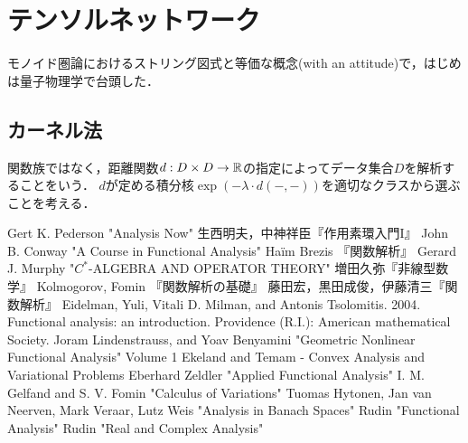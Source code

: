 \documentclass[uplatex,dvipdfmx]{jsreport}
\begin{document}
\section{テンソルネットワーク}

\begin{tcolorbox}[colframe=ForestGreen, colback=ForestGreen!10!white,breakable,colbacktitle=ForestGreen!40!white,coltitle=black,fonttitle=\bfseries\sffamily,
title=]
    モノイド圏論におけるストリング図式と等価な概念(with an attitude)で，はじめは量子物理学で台頭した．
\end{tcolorbox}

\subsection{カーネル法}

\begin{tcolorbox}[colframe=ForestGreen, colback=ForestGreen!10!white,breakable,colbacktitle=ForestGreen!40!white,coltitle=black,fonttitle=\bfseries\sffamily,
title=]
    関数族ではなく，距離関数$d:D\times D\to\mathbb{R}$の指定によってデータ集合$D$を解析することをいう．
    $d$が定める積分核$\exp(-\lambda\cdot d(-,-))$を適切なクラスから選ぶことを考える．
\end{tcolorbox}

\begin{thebibliography}{99}
    Gert K. Pederson "Analysis Now"
    生西明夫，中神祥臣『作用素環入門I』
    John B. Conway "A Course in Functional Analysis"
    Haïm Brezis 『関数解析』
    Gerard J. Murphy "$C^*$-ALGEBRA AND OPERATOR THEORY"
    増田久弥『非線型数学』
    Kolmogorov, Fomin 『関数解析の基礎』
    藤田宏，黒田成俊，伊藤清三『関数解析』
    Eidelman, Yuli, Vitali D. Milman, and Antonis Tsolomitis. 2004. Functional analysis: an introduction. Providence (R.I.): American mathematical Society.
    Joram Lindenstrauss, and Yoav Benyamini "Geometric Nonlinear Functional Analysis" Volume 1
    Ekeland and Temam -  Convex Analysis and Variational Problems
    Eberhard Zeldler "Applied Functional Analysis"
    I. M. Gelfand and S. V. Fomin "Calculus of Variations"
    Tuomas Hytonen, Jan van Neerven, Mark Veraar, Lutz Weis "Analysis in Banach Spaces"
    Rudin "Functional Analysis"
    Rudin "Real and Complex Analysis"
\end{thebibliography}
\end{document}
